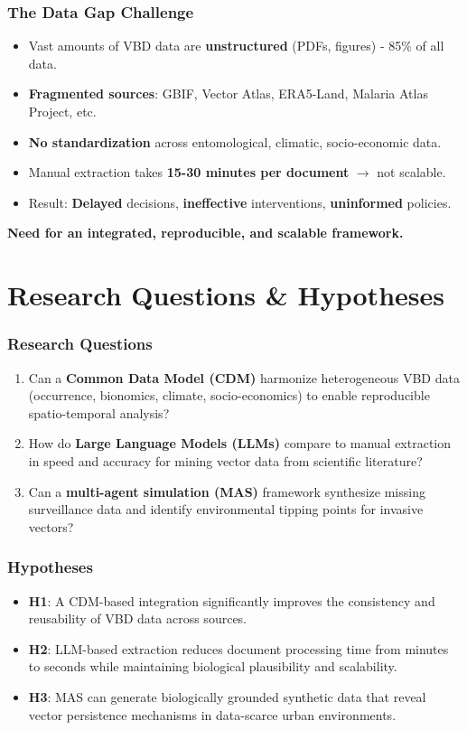 \documentclass{beamer}
\begin{document}
\begin{frame}
    \frametitle{The Data Gap Challenge}
    \begin{itemize}
        \item Vast amounts of VBD data are \textbf{unstructured} (PDFs, figures) - 85\% of all data.
        \item \textbf{Fragmented sources}: GBIF, Vector Atlas, ERA5-Land, Malaria Atlas Project, etc.
        \item \textbf{No standardization} across entomological, climatic, socio-economic data.
        \item Manual extraction takes \textbf{15-30 minutes per document} $\rightarrow$ not scalable.
        \item Result: \textbf{Delayed} decisions, \textbf{ineffective} interventions, \textbf{uninformed} policies.
    \end{itemize}
    \vspace{0.3cm}
    \centering
    \textcolor{alpha}{\textbf{Need for an integrated, reproducible, and scalable framework.}}
\end{frame}

\section{Research Questions \& Hypotheses}
\begin{frame}
    \frametitle{Research Questions}
    \begin{enumerate}
        \item Can a \textbf{Common Data Model (CDM)} harmonize heterogeneous VBD data (occurrence, bionomics, climate, socio-economics) to enable reproducible spatio-temporal analysis?
        \item How do \textbf{Large Language Models (LLMs)} compare to manual extraction in speed and accuracy for mining vector data from scientific literature?
        \item Can a \textbf{multi-agent simulation (MAS)} framework synthesize missing surveillance data and identify environmental tipping points for invasive vectors?
    \end{enumerate}
\end{frame}

\begin{frame}
    \frametitle{Hypotheses}
    \begin{itemize}
        \item \textbf{H1}: A CDM-based integration significantly improves the consistency and reusability of VBD data across sources.
        \item \textbf{H2}: LLM-based extraction reduces document processing time from minutes to seconds while maintaining biological plausibility and scalability.
        \item \textbf{H3}: MAS can generate biologically grounded synthetic data that reveal vector persistence mechanisms in data-scarce urban environments.
    \end{itemize}
\end{frame}
\end{document}
